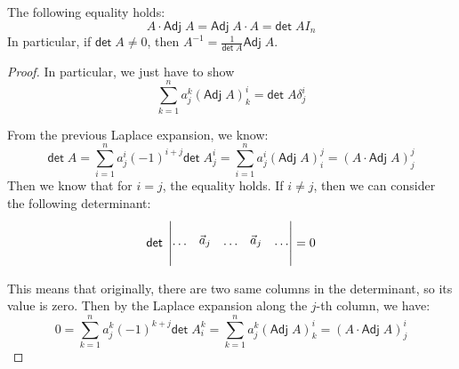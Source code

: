 \documentclass[
	11pt, %
	fleqn, %
	a4paper, %
]{LegrandOrangeBook}
\renewcommand{\det}{\mathsf{det\;}} %
\newcommand{\adj}{\mathsf{Adj\;}} %
\newcommand{\mypoint}[2]{\tikz[remember picture]{\node[inner sep=0, anchor=base](#1){$#2$};}}
\begin{document}
\begin{proposition}
    The following equality holds:
    \[
        A \cdot \adj A = \adj A \cdot A = \det A I_n
    \]
    In particular, if $\det A \neq 0$, then $A^{-1} = \frac{1}{\det A} \adj A$.
\end{proposition}
\begin{proof}
    In particular, we just have to show 
    \[
        \sum_{k = 1}^n a^k_j (\adj A)^i_k = \det A \delta^i_j
    \]

    From the previous Laplace expansion, we know:
    \[
        \det A = \sum_{i = 1}^n a_j^i (-1)^{i + j} \det A^i_j = \sum_{i = 1}^n a_j^i (\adj A)_i^j = (A \cdot \adj A)_j^j
    \]
    Then we know that for $i = j$, the equality holds. If $i \neq j$, then we can consider the following determinant:
    \vspace{4ex}
    \[
        \det \begin{vmatrix}
            \\
            \cdots & \mypoint{icol}{\vec{a}_j} & \cdots & \mypoint{jcol}{\vec{a}_j} & \cdots \\
            \\
        \end{vmatrix} = 0
    \]
    \vspace{2ex}

    This means that originally, there are two same columns in the determinant, so its value is zero. Then by the Laplace expansion along the $j$-th column, we have:
    \[
        0 = \sum_{k = 1}^n a_j^k (-1)^{k + j} \det A^k_i = \sum_{k = 1}^n a_j^k (\adj A)_k^i = (A \cdot \adj A)_j^i
    \]
\end{proof}
\end{document}
